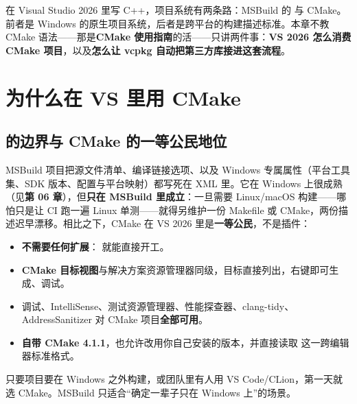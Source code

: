 
在 Visual Studio 2026 里写 C++，项目系统有两条路：MSBuild 的  与 CMake。前者是 Windows 的原生项目系统，后者是跨平台的构建描述标准。本章不教 CMake 语法——那是\textbf{CMake 使用指南}的活——只讲两件事：\textbf{VS 2026 怎么消费 CMake 项目}，以及\textbf{怎么让 vcpkg 自动把第三方库接进这套流程}。

\section{为什么在 VS 里用 CMake}
\subsection{ 的边界与 CMake 的一等公民地位}
MSBuild 项目把源文件清单、编译链接选项、以及 Windows 专属属性（平台工具集、SDK 版本、配置与平台映射）都写死在 XML 里。它在 Windows 上很成熟（见\textbf{第 06 章}），但\textbf{只在 MSBuild 里成立}：一旦需要 Linux/macOS 构建——哪怕只是让 CI 跑一遍 Linux 单测——就得另维护一份 Makefile 或 CMake，两份描述迟早漂移。相比之下，CMake 在 VS 2026 里是\textbf{一等公民}，不是插件：
\begin{itemize}
  \item \textbf{不需要任何扩展}： 就能直接开工。
  \item \textbf{CMake 目标视图}与解决方案资源管理器同级，目标直接列出，右键即可生成、调试。
  \item 调试、IntelliSense、测试资源管理器、性能探查器、clang-tidy、AddressSanitizer 对 CMake 项目\textbf{全部可用}。
  \item \textbf{自带 CMake 4.1.1}，也允许改用你自己安装的版本，并直接读取 \textbf{} 这一跨编辑器标准格式。
\end{itemize}
\begin{tipbox}[提示]
只要项目要在 Windows 之外构建，或团队里有人用 VS Code/CLion，第一天就选 CMake。MSBuild 只适合“确定一辈子只在 Windows 上”的场景。
\end{tipbox}

